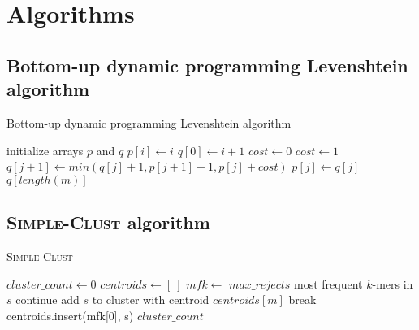 \section{Algorithms}

\subsection{Bottom-up dynamic programming Levenshtein algorithm}
\label{app:levenshtein_algorithm}

\begin{algorithm}
  \caption{Bottom-up dynamic programming Levenshtein algorithm}
  \label{alg:levenshtein}
  \begin{algorithmic}[1]
    \Statex
      \State initialize arrays $p$ and $q$
        \State $p[i] \gets i$
      \EndFor
        \State $q[0] \gets i+1$
            \State $cost \gets 0$
          \Else
            \State $cost \gets 1$
          \EndIf
          \State $q[j+1] \gets min(q[j] + 1, p[j+1] + 1, p[j] + cost)$
        \EndFor
          \State $p[j] \gets q[j]$
        \EndFor
      \EndFor
      \State \Return $q[length(m)]$
    \EndFunction
  \end{algorithmic}
\end{algorithm}

\newpage

\subsection{\textsc{Simple-Clust} algorithm}
\label{app:simple-clust}

\begin{algorithm}
  \caption{\textsc{Simple-Clust}}
  \label{alg:simple-clust}
  \begin{algorithmic}[1]
    \Statex
      \State $cluster\_count \gets 0$
      \State $centroids \gets [~]$ 
        \State $mfk \gets$ $max\_rejects$ most frequent $k$-mers in $s$
           \label{alg:line:simple_clust_lookup}
            \State continue
            \State add $s$ to cluster with centroid $centroids[m]$
            \State break
          \EndIf
        \EndFor
          \State centroids.insert(mfk[0], s)
        \EndIf
      \EndFor
      \State \Return $cluster\_count$
    \EndFunction
  \end{algorithmic}
\end{algorithm}
